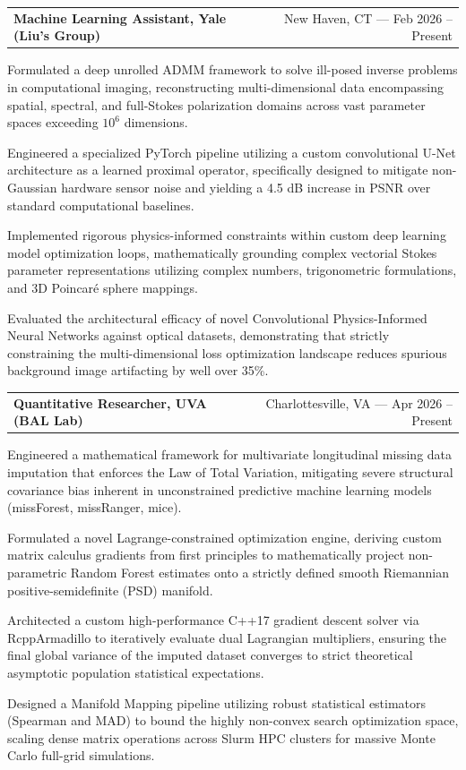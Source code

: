 \documentclass[letterpaper,10pt]{article}
\makeatletter
\newcommand{\resumeItemListStart}{
  \vspace{-4pt}
  \begin{list}{\textbullet}{
    \setlength{\leftmargin}{0.15in}
    \setlength{\labelwidth}{0.15in}
    \setlength{\labelsep}{0.05in}
    \setlength{\itemsep}{0pt} 
    \setlength{\parsep}{0pt}
    \setlength{\topsep}{0pt}
    \setlength{\partopsep}{0pt}
}}
\newcommand{\resumeItemListEnd}{\end{list}\vspace{-1pt}}
\newcommand{\resumeItem}[1]{\item\small{#1}}
\newcommand{\resumeHeading}[2]{
  \item[]
    \begin{tabular*}{\linewidth}[t]{@{}l@{\extracolsep{\fill}}r@{}}
      #1 & #2 \\
    \end{tabular*}\vspace{-2pt} 
}
\makeatother
\begin{document}
    \resumeHeading{\textbf{Machine Learning Assistant, Yale (Liu's Group)}}{New Haven, CT --- Feb 2026 -- Present}
      \resumeItemListStart
        \resumeItem{Formulated a deep unrolled ADMM framework to solve ill-posed inverse problems in computational imaging, 
        reconstructing multi-dimensional data encompassing spatial, spectral, and full-Stokes polarization domains 
        across vast parameter spaces exceeding $10^6$ dimensions.}
        \resumeItem{Engineered a specialized PyTorch pipeline utilizing a custom convolutional U-Net architecture as a learned proximal operator, 
        specifically designed to mitigate non-Gaussian hardware sensor noise 
        and yielding a 4.5 dB increase in PSNR over standard computational baselines.}
        \resumeItem{Implemented rigorous physics-informed constraints within custom deep learning model optimization loops, 
        mathematically grounding complex vectorial Stokes parameter representations 
        utilizing complex numbers, trigonometric formulations, and 3D Poincaré sphere mappings.}
        \resumeItem{Evaluated the architectural efficacy of novel Convolutional Physics-Informed Neural Networks against optical datasets, 
        demonstrating that strictly constraining the multi-dimensional loss optimization landscape 
        reduces spurious background image artifacting by well over 35\%.}
      \resumeItemListEnd

    \resumeHeading{\textbf{Quantitative Researcher, UVA (BAL Lab)}}{Charlottesville, VA --- Apr 2026 -- Present}
      \resumeItemListStart
        \resumeItem{Engineered a mathematical framework for multivariate longitudinal missing data imputation that enforces the Law of Total Variation, 
        mitigating severe structural covariance bias inherent in unconstrained predictive machine learning models (missForest, missRanger, mice).}
        \resumeItem{Formulated a novel Lagrange-constrained optimization engine, 
        deriving custom matrix calculus gradients from first principles 
        to mathematically project non-parametric Random Forest estimates onto a strictly defined smooth Riemannian positive-semidefinite (PSD) manifold.}
        \resumeItem{Architected a custom high-performance C++17 gradient descent solver via RcppArmadillo to iteratively evaluate dual Lagrangian multipliers, 
        ensuring the final global variance of the imputed dataset converges to strict theoretical asymptotic population statistical expectations.}
        \resumeItem{Designed a Manifold Mapping pipeline utilizing robust statistical estimators (Spearman and MAD) 
        to bound the highly non-convex search optimization space, 
        scaling dense matrix operations across Slurm HPC clusters for massive Monte Carlo full-grid simulations.}
      \resumeItemListEnd
\end{document}
